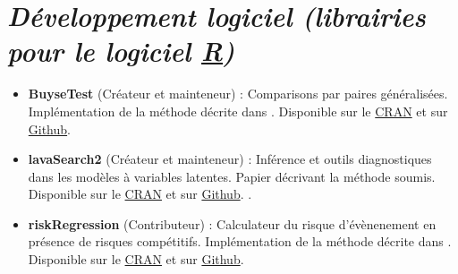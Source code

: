 \documentclass[12pt]{article}
\begin{document}
\section*{\emph{Développement logiciel (librairies pour le logiciel \href{https://www.r-project.org/}{R})}}
\label{sec:org8d89057}
\begin{minipage}{0.01\textwidth}
\hspace{\fill}
\end{minipage}
\begin{minipage}{0.92\textwidth}
\begin{itemize}
\item \textbf{BuyseTest} (Créateur et mainteneur) : Comparisons par paires
généralisées. Implémentation de la méthode décrite dans
\citep{peron2016extension}. Disponible sur le \href{https://cran.r-project.org/web/packages/BuyseTest/index.html}{CRAN} et sur \href{https://github.com/bozenne/BuyseTest}{Github}.

\item \textbf{lavaSearch2} (Créateur et mainteneur) : Inférence et outils
diagnostiques dans les modèles à variables latentes. Papier
décrivant la méthode soumis. Disponible sur le \href{https://cran.r-project.org/web/packages/lavaSearch2/index.html}{CRAN} et sur \href{https://github.com/bozenne/lavaSearch2}{Github}. .

\item \textbf{riskRegression} (Contributeur) : Calculateur du risque
d'évènenement en présence de risques compétitifs. Implémentation de
la méthode décrite dans \citep{ozenne2017riskregression}. Disponible
sur le \href{https://cran.r-project.org/web/packages/riskRegression/index.html}{CRAN} et sur \href{https://github.com/tagteam/riskRegression}{Github}.
\end{itemize}
\end{minipage}

\bigskip
\end{document}
